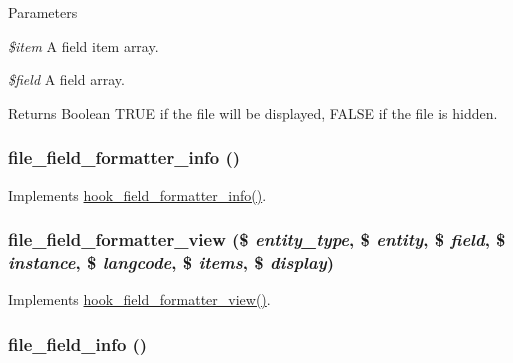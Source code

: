 \begin{DoxyParams}{Parameters}
\item[{\em \$item}]A field item array. \item[{\em \$field}]A field array.\end{DoxyParams}
\begin{DoxyReturn}{Returns}
Boolean TRUE if the file will be displayed, FALSE if the file is hidden. 
\end{DoxyReturn}
\hypertarget{file_8field_8inc_a03fe1882e784494cd80b0936108a2fb2}{
\subsubsection[{file\_\-field\_\-formatter\_\-info}]{\setlength{\rightskip}{0pt plus 5cm}file\_\-field\_\-formatter\_\-info ()}}
\label{file_8field_8inc_a03fe1882e784494cd80b0936108a2fb2}
Implements \hyperlink{group__field__formatter_ga2f5aa1c7455f55dffd84a48efa57f987}{hook\_\-field\_\-formatter\_\-info()}. \hypertarget{file_8field_8inc_a91718368e9756a53ea08415f8f933901}{
\subsubsection[{file\_\-field\_\-formatter\_\-view}]{\setlength{\rightskip}{0pt plus 5cm}file\_\-field\_\-formatter\_\-view (\$ {\em entity\_\-type}, \/  \$ {\em entity}, \/  \$ {\em field}, \/  \$ {\em instance}, \/  \$ {\em langcode}, \/  \$ {\em items}, \/  \$ {\em display})}}
\label{file_8field_8inc_a91718368e9756a53ea08415f8f933901}
Implements \hyperlink{group__field__formatter_gaa588d99481fa147a1c88416e55fdfad6}{hook\_\-field\_\-formatter\_\-view()}. \hypertarget{file_8field_8inc_a58982edb906e7c17a5233247ccb712c0}{
\subsubsection[{file\_\-field\_\-info}]{\setlength{\rightskip}{0pt plus 5cm}file\_\-field\_\-info ()}}
